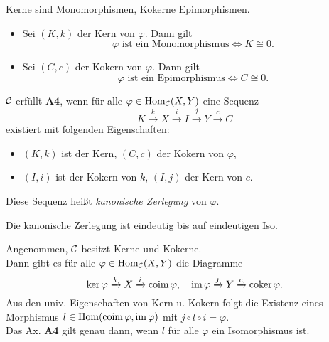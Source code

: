 \documentclass{cheat-sheet}
\DeclareMathOperator{\coker}{coker} %
\DeclareMathOperator{\coim}{coim} %
\begin{document}
\begin{lem}
  Kerne sind Monomorphismen, Kokerne Epimorphismen.
\end{lem}

\begin{lem}
  \begin{itemize}
    \item Sei $(K, k)$ der Kern von $\varphi$. Dann gilt
    \[ \varphi \text{ ist ein Monomorphismus} \iff K \cong 0. \]
    \item Sei $(C, c)$ der Kokern von $\varphi$. Dann gilt
    \[ \varphi \text{ ist ein Epimorphismus} \iff C \cong 0. \]
  \end{itemize}
\end{lem}

\begin{axiom}
  $\mathcal{C}$ erfüllt \textbf{A4}, wenn für alle $\varphi \in \operatorname{Hom}_{\mathcal{C}}(X, Y)$ eine Sequenz
  \[ K \xrightarrow{k} X \xrightarrow{i} I \xrightarrow{j} Y \xrightarrow{c} C \]
  existiert mit folgenden Eigenschaften: 
  \begin{itemize}
    \item $(K, k)$ ist der Kern, $(C, c)$ der Kokern von $\varphi$,
    \item $(I, i)$ ist der Kokern von $k$, $(I, j)$ der Kern von $c$.
  \end{itemize}
  Diese Sequenz heißt \emph{kanonische Zerlegung} von $\varphi$.
\end{axiom}

\begin{bem}
  Die kanonische Zerlegung ist eindeutig bis auf eindeutigen Iso.
\end{bem}

\begin{bem}
  Angenommen, $\mathcal{C}$ besitzt Kerne und Kokerne. \\
  Dann gibt es für alle $\varphi \in \operatorname{Hom}_{\mathcal{C}}(X, Y)$ die Diagramme
  \[
    \ker \varphi \xrightarrow{k} X \xrightarrow{i} \coim \varphi, \quad
    \im \varphi \xrightarrow{j} Y \xrightarrow{c} \coker \varphi.
  \]
  Aus den univ. Eigenschaften von Kern u. Kokern folgt die Existenz eines Morphismus $l \in \Hom(\coim \varphi, \im \varphi)$ mit $j \circ l \circ i = \varphi$. \\
  Das Ax. \textbf{A4} gilt genau dann, wenn $l$ für alle $\varphi$ ein Isomorphismus ist.
\end{bem}

\end{document}
